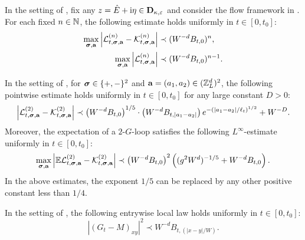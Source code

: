 \begin{lemma}\label{ML:GLoop}
In the setting of , fix any $z=\hat{E}+\mathrm{i} \eta\in \mathbf D_{\kappa,{\varepsilon}}$ and consider the flow framework in . For each fixed $n\in \mathbb{N}$, the following estimate holds uniformly in $t\in [0,t_0]$: 
\begin{align}\label{Eq:L-KGt}
 \max_{{\boldsymbol{\sigma}}, \mathbf{a}}\left|{\mathcal L}^{(n)}_{t, {\boldsymbol{\sigma}}, \mathbf{a}}-{\mathcal K}^{(n)}_{t, {\boldsymbol{\sigma}}, \mathbf{a}}\right|&\prec  (W^{-d}B_{t,0})^{ n}, \\
 \label{Eq:L-KGt2}
\max_{{\boldsymbol{\sigma}}, \mathbf{a}}\left|{\mathcal L}^{(n)}_{t, {\boldsymbol{\sigma}}, \mathbf{a}} \right|&\prec (W^{-d}B_{t,0})^{ n-1}.
\end{align}
\end{lemma}

\begin{lemma}\label{ML:GLoop_expec}
In the setting of , for ${\boldsymbol{\sigma}}\in\{+,-\}^2$ and $ {\mathbf{a}}=(a_1, a_2)\in ({\mathbb Z}_L^d)^2$, the following pointwise estimate holds uniformly in $t\in [0,t_0]$ for any large constant $D>0$: 
\begin{equation}\label{Eq:Gdecay}
 \left| {\mathcal L}^{(2)}_{t, {\boldsymbol{\sigma}}, \mathbf{a}}-{\mathcal K}^{(2)}_{t, {\boldsymbol{\sigma}}, \mathbf{a}}\right|\prec 
 \left({W^{-d}B_{t, 0}}\right)^{1/5}\cdot \left({W^{-d}B_{t,  |a_1-a_2| }}\right)e^{-\left({| a_1-a_2| }/{\ell_t}\right)^{1/2}} + W^{-D}. 
\end{equation}
Moreover, the expectation of a $2$-$G$-loop satisfies the following $L^\infty$-estimate uniformly in $t\in [0,t_0]$: 
\begin{equation}\label{Eq:Gtlp_exp}
 \max_{{\boldsymbol{\sigma}}, {\mathbf{a}}}\left|\mathbb{E}{\mathcal L}^{(2)}_{t, {\boldsymbol{\sigma}}, {\mathbf{a}}}-{\mathcal K}^{(2)}_{t, {\boldsymbol{\sigma}}, {\mathbf{a}}}\right|\prec \left({W^{-d}B_{t,0}}\right)^2 \left({(g^2W^d)^{-1/5}+W^{-d}B_{t,0}}\right)
 . 
\end{equation}
In the above estimates, the exponent $1/5$ can be replaced by any other positive constant less than $1/4$.
\end{lemma}

\begin{lemma}\label{ML:GtLocal}
In the setting of , the following entrywise local law holds uniformly in $t\in [0,t_0]$: 
\begin{equation}\label{Gt_bound}
 |(G_{t}-M)_{xy}|^2\prec W^{-d}B_{t,(|x-y|/W)} .
   \end{equation} 
\end{lemma}
 
